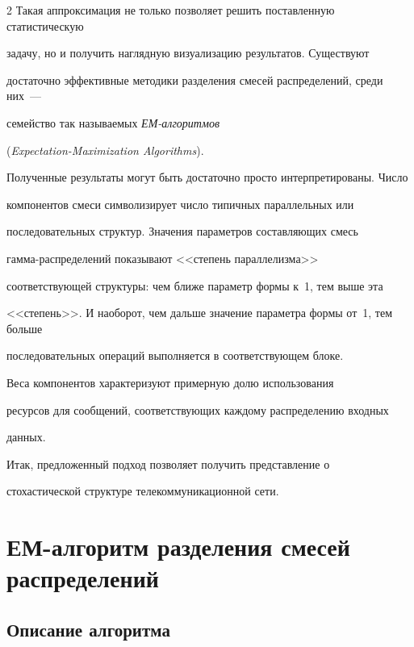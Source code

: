 \begin{multicols}{2}
Такая аппроксимация не только позволяет решить поставленную статистическую


задачу, но и полу\-чить наглядную визуализацию результатов. Существуют


достаточно эффективные методики разделения смесей распределений, среди них~---


семейство так называемых \textit{ЕМ-алгоритмов}


(\textit{Expectation-Maximization Algorithms}).





Полученные результаты могут быть достаточно просто интерпретированы. Число


компонентов смеси символизирует число типичных параллельных или


последовательных структур. Значения параметров составляющих смесь


гам\-ма-рас\-пре\-де\-ле\-ний показывают <<степень параллелизма>>


соответствующей структуры: чем ближе параметр формы к~1, тем выше эта


<<степень>>. И наоборот, чем дальше значение параметра формы от~1, тем больше


последовательных операций выполняется в соответствующем блоке.





Веса компонентов характеризуют примерную долю использования


ресурсов для сообщений, соответствующих каждому распределению входных


данных.





Итак, предложенный подход позволяет получить представление о


стохастической структуре телекоммуникационной сети.





\section{ЕМ-алгоритм разделения смесей распределений}





\subsection{Описание алгоритма} %






\end{multicols}
